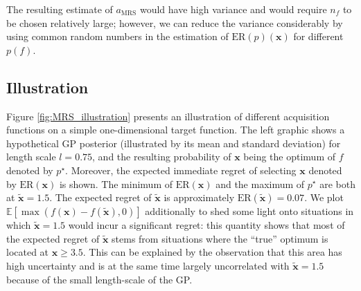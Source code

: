 \documentclass[10pt,letterpaper]{article} %
\begin{document}
The resulting estimate of $a_{\text{MRS}}$ would have high variance and would require $n_f$ to be
chosen relatively large; however, we can reduce the variance considerably by using
common random numbers \citep{kahn_methods_1953} in the estimation of
$\text{ER}(p)(\mathbf{x})$ for different $p(f)$.


\subsection{Illustration} \label{Section:MRS_Illustration}

Figure \ref{fig:MRS_illustration} presents an illustration of different
acquisition functions on a simple one-dimensional target function. The left
graphic shows a hypothetical GP posterior (illustrated by its mean and standard
deviation) for length scale $l=0.75$, and the resulting probability of $\mathbf{x}$
being the optimum of $f$ denoted by $p^\star$.
Moreover, the expected immediate regret of selecting $\mathbf{x}$ denoted by
$\text{ER}(\mathbf{x})$ is shown. The minimum of $\text{ER}(\mathbf{x})$ and the maximum
of $p^\star$ are both at $\mathbf{\tilde x}=1.5$. The expected regret of $\mathbf{\tilde x}$
is approximately $\text{ER}(\mathbf{\tilde x}) = 0.07$. We plot $\mathbb{E}[\max(f(\mathbf{x}) -
f(\mathbf{\tilde x}), 0)]$ additionally to shed some light onto situations in which $
\mathbf{\tilde x} = 1.5$ would incur a significant regret: this quantity shows that most of the
expected regret of $\mathbf{\tilde x}$ stems from situations where the ``true''
optimum is located at $\mathbf{x} \geq 3.5$. This can be explained by the
observation that this area has high uncertainty and is at the same time largely
uncorrelated with $\mathbf{\tilde x} = 1.5$ because of the small length-scale of the GP.
\end{document}
